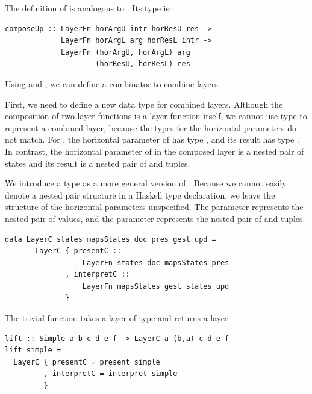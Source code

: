 \documentclass[preprint,natbib]{sigplanconf}
\begin{document}
The definition of  is analogous to . Its type is:

\begin{small}
\begin{verbatim}
composeUp :: LayerFn horArgU intr horResU res ->
             LayerFn horArgL arg horResL intr ->
             LayerFn (horArgU, horArgL) arg
                     (horResU, horResL) res
\end{verbatim}
\end{small}


Using  and , we can define a combinator to combine  layers. 


First, we need to define a new data type for combined layers. Although the composition of two layer functions is a layer function itself, we cannot use type  to represent a combined layer, because the types for the horizontal parameters do not match.  For , the horizontal parameter of  has type , and its result has type . In contrast, the horizontal parameter of  in the composed layer is a nested pair of states and its result is a nested pair of  and  tuples. 

We introduce a type  as a more general version of . Because we cannot easily denote a nested pair structure in a Haskell type declaration, we leave the structure of the horizontal parameters unspecified. The parameter  represents the nested pair of  values, and the parameter  represents the nested pair of  and  tuples.

\begin{small}
\begin{verbatim}
data LayerC states mapsStates doc pres gest upd =
       LayerC { presentC ::   
                  LayerFn states doc mapsStates pres
              , interpretC :: 
                  LayerFn mapsStates gest states upd
              }
\end{verbatim}
\end{small}

The trivial function  takes a layer of type  and returns a  layer.

\begin{small}
\begin{verbatim}
lift :: Simple a b c d e f -> LayerC a (b,a) c d e f
lift simple = 
  LayerC { presentC = present simple
         , interpretC = interpret simple
         }
\end{verbatim}
\end{small}
\end{document}

